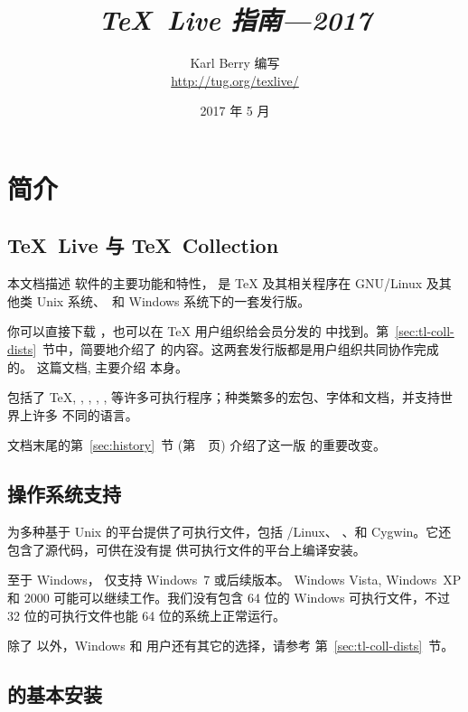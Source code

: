 \documentclass{article}
\title{%
  {\huge \textit{\TeX\ Live 指南---2017}}%
}
\author{Karl Berry 编写 \\[3mm]
        \url{http://tug.org/texlive/}
       }
\date{2017 年 5 月}
\begin{document}
\maketitle

\begin{multicols}{2}
\tableofcontents
\end{multicols}

\section{简介}
\label{sec:intro}

\subsection{\protect\TeX\protect\ Live 与 \protect\TeX\protect\ Collection}

本文档描述 \TL{} 软件的主要功能和特性，\TL{} 是 \TeX{} 及其相关程序在
GNU/Linux 及其他类 Unix 系统、\MacOSX\ 和 Windows
系统下的一套发行版。

你可以直接下载 \TL{}，也可以在 \TeX{} 用户组织给会员分发的 \TK{}
\DVD 中找到。第~\ref{sec:tl-coll-dists}~节中，简要地介绍了
\DVD 的内容。这两套发行版都是用户组织共同协作完成的。
这篇文档, 主要介绍 \TL{} 本身。

\TL{} 包括了 \TeX{}, \LaTeXe{}, \ConTeXt, \MF, \MP, \BibTeX{}
等许多可执行程序；种类繁多的宏包、字体和文档，并支持世界上许多
不同的语言。

文档末尾的第~\ref{sec:history}~节 (第~\pageref{sec:history}~页)
介绍了这一版 \TL{} 的重要改变。

\subsection{操作系统支持}
\label{sec:os-support}

\TL{} 为多种基于 Unix 的平台提供了可执行文件，包括 \GNU/Linux、
\MacOSX{}、和 Cygwin。它还包含了源代码，可供在没有提
供可执行文件的平台上编译安装。

至于 Windows，\TL{} 仅支持 Windows~7 或后续版本。
Windows Vista, Windows~XP 和 2000 可能可以继续工作。我们没有包含 64 位的 Windows
可执行文件，不过 32 位的可执行文件也能 64 位的系统上正常运行。

除了 \TL{} 以外，Windows 和 \MacOSX 用户还有其它的选择，请参考
第~\ref{sec:tl-coll-dists}~节。

\subsection{\protect\TL{} 的基本安装}
\label{sec:basic}
\end{document}
